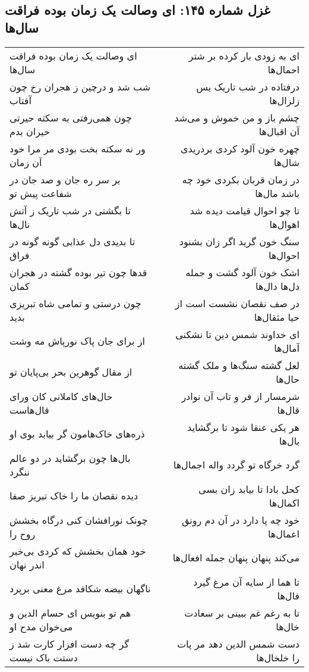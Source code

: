 \begin{center}
\section*{غزل شماره ۱۴۵: ای وصالت یک زمان بوده فراقت سال‌ها}
\label{sec:0145}
\begin{longtable}{l p{0.5cm} r}
ای وصالت یک زمان بوده فراقت سال‌ها
&&
ای به زودی بار کرده بر شتر احمال‌ها
\\
شب شد و درچین ز هجران رخ چون آفتاب
&&
درفتاده در شب تاریک بس زلزال‌ها
\\
چون همی‌رفتی به سکته حیرتی حیران بدم
&&
چشم باز و من خموش و می‌شد آن اقبال‌ها
\\
ور نه سکته بخت بودی مر مرا خود آن زمان
&&
چهره خون آلود کردی بردریدی شال‌ها
\\
بر سر ره جان و صد جان در شفاعت پیش تو
&&
در زمان قربان بکردی خود چه باشد مال‌ها
\\
تا بگشتی در شب تاریک ز آتش نال‌ها
&&
تا چو احوال قیامت دیده شد اهوال‌ها
\\
تا بدیدی دل عذابی گونه گونه در فراق
&&
سنگ خون گرید اگر زان بشنود احوال‌ها
\\
قدها چون تیر بوده گشته در هجران کمان
&&
اشک خون آلود گشت و جمله دل‌ها دال‌ها
\\
چون درستی و تمامی شاه تبریزی بدید
&&
در صف نقصان نشست است از حیا مثقال‌ها
\\
از برای جان پاک نورپاش مه وشت
&&
ای خداوند شمس دین تا نشکنی آمال‌ها
\\
از مقال گوهرین بحر بی‌پایان تو
&&
لعل گشته سنگ‌ها و ملک گشته حال‌ها
\\
حال‌های کاملانی کان ورای قال‌هاست
&&
شرمسار از فر و تاب آن نوادر قال‌ها
\\
ذره‌های خاک‌هامون گر بیابد بوی او
&&
هر یکی عنقا شود تا برگشاید بال‌ها
\\
بال‌ها چون برگشاید در دو عالم ننگرد
&&
گرد خرگاه تو گردد واله اجمال‌ها
\\
دیده نقصان ما را خاک تبریز صفا
&&
کحل بادا تا بیابد زان بسی اکمال‌ها
\\
چونک نورافشان کنی درگاه بخشش روح را
&&
خود چه پا دارد در آن دم رونق اعمال‌ها
\\
خود همان بخشش که کردی بی‌خبر اندر نهان
&&
می‌کند پنهان پنهان جمله افعال‌ها
\\
ناگهان بیضه شکافد مرغ معنی برپرد
&&
تا هما از سایه آن مرغ گیرد فال‌ها
\\
هم تو بنویس ای حسام الدین و می‌خوان مدح او
&&
تا به رغم غم ببینی بر سعادت خال‌ها
\\
گر چه دست افزار کارت شد ز دستت باک نیست
&&
دست شمس الدین دهد مر پات را خلخال‌ها
\\
\end{longtable}
\end{center}
